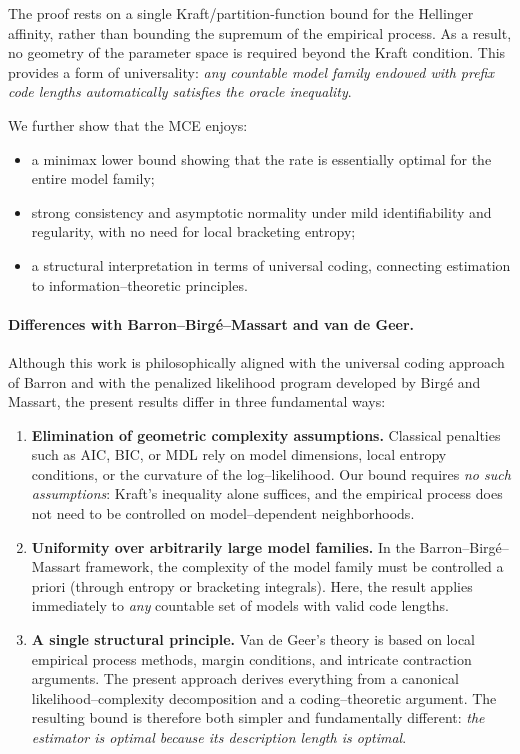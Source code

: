 \documentclass[12pt]{article}
\numberwithin{equation}{section}
\begin{document}
The proof rests on a single Kraft/partition-function bound for the
Hellinger affinity, rather than bounding the supremum of
the empirical process.
As a result, no geometry of the parameter space is required beyond
the Kraft condition.  This provides a form of universality:
\emph{any countable model family endowed with prefix code lengths
	automatically satisfies the oracle inequality}.  

We further show that the MCE enjoys:
\begin{itemize}
	\item a minimax lower bound showing that the rate is
	essentially optimal for the entire model family;
	\item strong consistency and asymptotic normality under mild
	identifiability and regularity, with no need for local
	bracketing entropy;
	\item a structural interpretation in terms of universal coding,
	connecting estimation to information–theoretic principles.
\end{itemize}

\paragraph{Differences with Barron–Birgé–Massart and van de Geer.}
Although this work is philosophically aligned with the universal coding
approach of Barron and with the penalized likelihood program developed
by Birgé and Massart, the present results differ in three fundamental
ways:

\begin{enumerate}
	\item \textbf{Elimination of geometric complexity assumptions.}
	Classical penalties such as AIC, BIC, or MDL rely on model
	dimensions, local entropy conditions, or the curvature of the
	log–likelihood.  
	Our bound requires \emph{no such assumptions}: Kraft’s inequality
	alone suffices, and the empirical process does not need to be
	controlled on model–dependent neighborhoods.
	
	\item \textbf{Uniformity over arbitrarily large model families.}
	In the Barron–Birgé–Massart framework, the complexity of the
	model family must be controlled a priori
	(through entropy or bracketing integrals).  
	Here, the result applies immediately to \emph{any} countable set
	of models with valid code lengths.
	
	\item \textbf{A single structural principle.}
	Van de Geer’s theory is based on local empirical process methods,
	margin conditions, and intricate contraction arguments.
	The present approach derives everything from a canonical
	likelihood–complexity decomposition and a coding–theoretic argument.
	The resulting bound is therefore both simpler and fundamentally different:
	\emph{the estimator is optimal because its description length is optimal}.
\end{enumerate}
\end{document}
